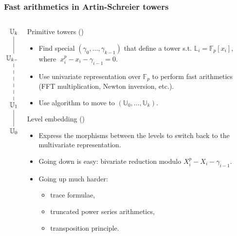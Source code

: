 \documentclass[10pt]{beamer}
\newcommand{\LK}{\mathbb{L}}  %
\newcommand{\U}{\mathbb{U}}  %
\newcommand{\F}{\mathbb{F}}  %
\newcommand{\0}{\mathcal{O}}  %
\begin{document}
\begin{frame}
  \frametitle{Fast arithmetics in Artin-Schreier towers}

  \begin{columns}
    \begin{column}{0.1\textwidth}
      \Large\[\xymatrix{
        \U_k\ar@{-}[d]\\
        \U_{k-1} \ar@{--}[dd]\\
        \\
        \U_1 \ar@{-}[d]\\
        \U_0
      }\]
    \end{column}
    \begin{column}{0.85\textwidth}
      \begin{block}{Primitive towers (\cite{DFS09})}
        \begin{itemize}
        \item Find special $(\gamma_0,\ldots,\gamma_{k-1})$ that
          define a tower s.t. $\LK_i = \F_p[x_i]$, where
          $\;x_i^p-x_i-\gamma_{i-1}=0$.
        \item Use univariate representation over $\F_p$ to perform
          fast arithmetics (FFT multiplication, Newton inversion,
          etc.).
        \item Use \cite{Couveignes00} algorithm to move to
          $(\U_0,\ldots,\U_k)$.
        \end{itemize}
      \end{block}
      
      \begin{block}{Level embedding (\cite{DFS09})}
        \begin{itemize}
        \item Express the morphisms between the levels to switch back
          to the multivariate representation.
        \item Going down is easy: bivariate reduction modulo
          $X_i^p-X_i-\gamma_{i-1}$.
        \item Going up much harder:
          \begin{itemize}
          \item trace formulae,
          \item truncated power series arithmetics,
          \item transposition principle.
          \end{itemize}
        \end{itemize}
      \end{block}
    \end{column}
  \end{columns}
\end{frame}
\end{document}
